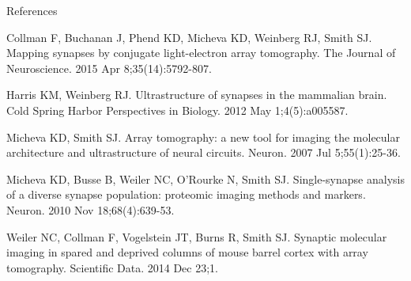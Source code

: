 \documentclass[final, table]{beamer}
\newlength{\onecolwid}
\begin{document}
\begin{frame}[t]
\begin{columns}[t]
\begin{column}{\onecolwid}
\begin{block}{References}
{\begin{thebibliography}{99}
Collman F, Buchanan J, Phend KD, Micheva KD, Weinberg RJ, Smith SJ. Mapping synapses by conjugate light-electron array tomography. The Journal of Neuroscience. 2015 Apr 8;35(14):5792-807.
 
Harris KM, Weinberg RJ. Ultrastructure of synapses in the mammalian brain. Cold Spring Harbor Perspectives in Biology. 2012 May 1;4(5):a005587.

Micheva KD, Smith SJ. Array tomography: a new tool for imaging the molecular architecture and ultrastructure of neural circuits. Neuron. 2007 Jul 5;55(1):25-36.

Micheva KD, Busse B, Weiler NC, O'Rourke N, Smith SJ. Single-synapse analysis of a diverse synapse population: proteomic imaging methods and markers. Neuron. 2010 Nov 18;68(4):639-53.


Weiler NC, Collman F, Vogelstein JT, Burns R, Smith SJ. Synaptic molecular imaging in spared and deprived columns of mouse barrel cortex with array tomography. Scientific Data. 2014 Dec 23;1.

\end{thebibliography}}
\end{block}

\end{column}


\end{columns}
\end{frame}
\end{document}
